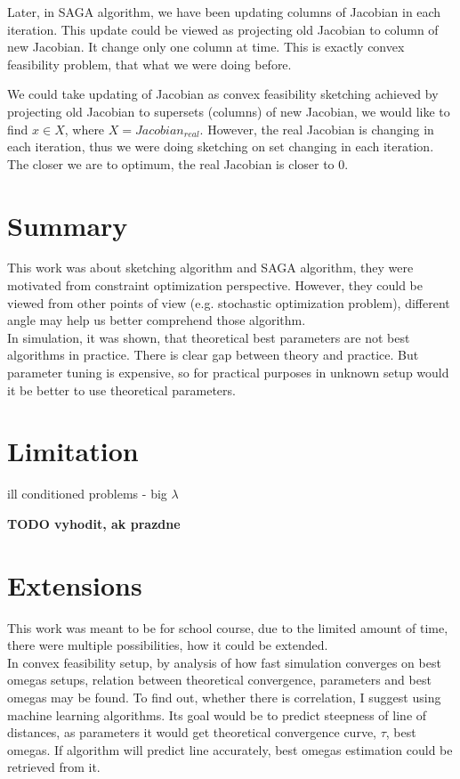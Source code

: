 \documentclass[11pt]{book}
\begin{document}
Later, in SAGA algorithm, we have been updating columns of Jacobian in each iteration. This update could be viewed as projecting old Jacobian to column of new Jacobian. It change only one column at time. This is exactly convex feasibility problem, that what we were doing before.

We could take updating of Jacobian as convex feasibility sketching achieved by projecting old Jacobian to supersets (columns) of new Jacobian, we would like to find $x \in X$, where $X=Jacobian_{real}$. However, the real Jacobian is changing in each iteration, thus we were doing sketching on set changing in each iteration. The closer we are to optimum, the real Jacobian is closer to $0$.



\section{Summary}
This work was about sketching algorithm and SAGA algorithm, they were motivated from constraint optimization perspective. However, they could be viewed from other points of view (e.g. stochastic optimization problem), different angle may help us better comprehend those algorithm.\\

In simulation, it was shown, that theoretical best parameters are not best algorithms in practice. There is clear gap between theory and practice. But parameter tuning is expensive, so for practical purposes in unknown setup would it be better to use theoretical parameters.


\section{Limitation}
ill conditioned problems - big $\lambda$

\textbf{TODO vyhodit, ak prazdne}

\section{Extensions}
This work was meant to be for school course, due to the limited amount of time, there were multiple possibilities, how it could be extended.\\


In convex feasibility setup, by analysis of how fast simulation converges on best omegas setups, relation between theoretical convergence, parameters and best omegas may be found. To find out, whether there is correlation, I suggest using machine learning algorithms. Its goal would be to predict steepness of line of distances, as parameters it would get theoretical convergence curve, $\tau$, best omegas. If algorithm will predict line accurately, best omegas estimation could be retrieved from it.\\
\end{document}
